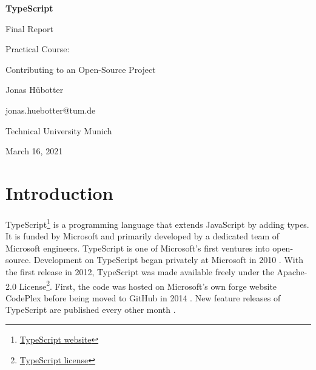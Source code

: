 \documentclass[12pt]{scrartcl}
\begin{document}

\begin{titlepage}
    \begin{center}
        \vspace*{\fill}

        \Huge
        \textbf{TypeScript}

        \LARGE
        Final Report

        \vspace{0.5cm}
        \large
        Practical Course:\par
        Contributing to an Open-Source Project

        \vspace{5cm}

        Jonas Hübotter

        \small
        jonas.huebotter@tum.de

        \vspace{0.5cm}

        Technical University Munich

        March 16, 2021

        \vspace*{\fill}
    \end{center}
\end{titlepage}


\setcounter{tocdepth}{2}
\tableofcontents{}
\clearpage

\section{Introduction}

TypeScript\footnote{\href{https://www.typescriptlang.org/}{TypeScript website}} is a programming language that extends JavaScript by adding types. It is funded by Microsoft and primarily developed by a dedicated team of Microsoft engineers. TypeScript is one of Microsoft's first ventures into open-source. Development on TypeScript began privately at Microsoft in 2010 \cite{Tung2020}. With the first release in 2012, TypeScript was made available freely under the Apache-2.0 License\footnote{\href{https://github.com/microsoft/TypeScript/blob/master/LICENSE.txt}{TypeScript license}}. First, the code was hosted on Microsoft's own forge website CodePlex before being moved to GitHub in 2014 \cite{Turner2014}. New feature releases of TypeScript are published every other month \cite{Rosenwasser2017}.
\end{document}
